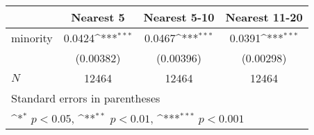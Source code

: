 {
\def\sym#1{\ifmmode^{#1}\else\(^{#1}\)\fi}
\begin{tabular}{l*{3}{c}}
\hline\hline
            &\multicolumn{1}{c}{Nearest 5}&\multicolumn{1}{c}{Nearest 5-10}&\multicolumn{1}{c}{Nearest 11-20}\\
\hline
minority    &      0.0424\sym{***}&      0.0467\sym{***}&      0.0391\sym{***}\\
            &   (0.00382)         &   (0.00396)         &   (0.00298)         \\
\hline
\(N\)       &       12464         &       12464         &       12464         \\
\hline\hline
\multicolumn{4}{l}{\footnotesize Standard errors in parentheses}\\
\multicolumn{4}{l}{\footnotesize \sym{*} \(p<0.05\), \sym{**} \(p<0.01\), \sym{***} \(p<0.001\)}\\
\end{tabular}
}
